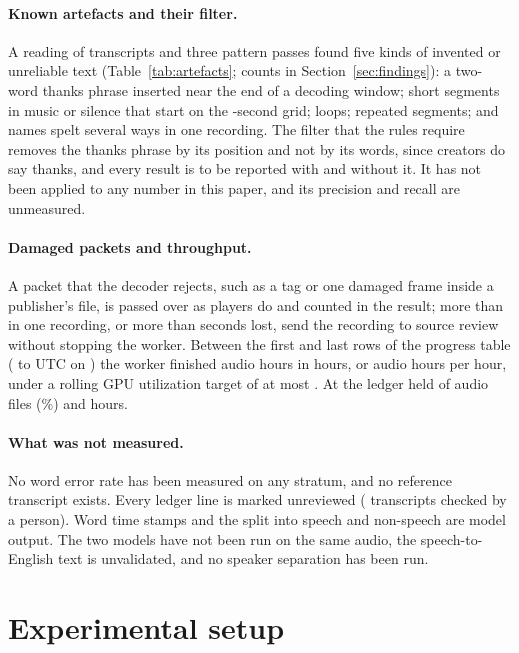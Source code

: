 \documentclass[letterpaper]{article} %
\begin{document}
\paragraph{Known artefacts and their filter.} A reading of \ReadN{} transcripts and three pattern passes found five kinds of invented or unreliable text (Table~\ref{tab:artefacts}; counts in Section~\ref{sec:findings}): a two-word thanks phrase inserted near the end of a decoding window; short segments in music or silence that start on the \WindowSeconds-second grid; loops; repeated segments; and names spelt several ways in one recording. The filter that the rules require removes the thanks phrase by its position and not by its words, since creators do say thanks, and every result is to be reported with and without it. It has not been applied to any number in this paper, and its precision and recall are unmeasured.

\paragraph{Damaged packets and throughput.} A packet that the decoder rejects, such as a tag or one damaged frame inside a publisher's file, is passed over as players do and counted in the result; more than \PacketLimit{} in one recording, or more than \PacketSecondsLimit{} seconds lost, send the recording to source review without stopping the worker. Between the first and last rows of the progress table (\ThroughputFirstRow{} to \ThroughputLastRow{} UTC on \SnapDate) the worker finished \ThroughputAudioHours{} audio hours in \ThroughputWallHours{} hours, or \ThroughputRate{} audio hours per hour, under a rolling GPU utilization target of at most \UtilTarget. At \NowStamp{} the ledger held \NowAudio{} of \NRunAudio{} audio files (\NowPctAudio\%) and \NowHours{} hours.

\paragraph{What was not measured.} No word error rate has been measured on any stratum, and no reference transcript exists. Every ledger line is marked unreviewed (\NHumanReviewed{} transcripts checked by a person). Word time stamps and the split into speech and non-speech are model output. The two models have not been run on the same audio, the speech-to-English text is unvalidated, and no speaker separation has been run.

\section{Experimental setup}
\label{sec:setup}
\end{document}
